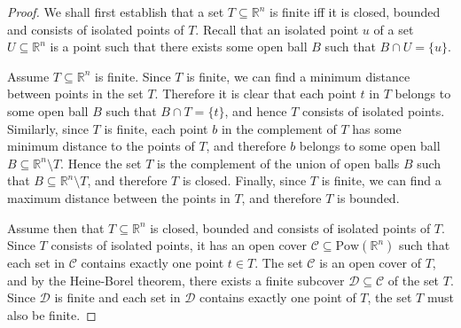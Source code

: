 \documentclass{LMCS}
\theoremstyle{plain}
\newcommand{\rsq}{\mathbb{R}^n}
\begin{document}
%
\begin{proof}
%
We shall first establish that a set $T\subseteq\rsq$ is finite
%
iff it is closed, bounded and
%
consists of isolated points of $T$. Recall that an
%
isolated point $u$ of a set $U\subseteq\rsq$ is a point
%
such that there exists some open ball $B$ such that $B\cap U =\{u\}$.
%
%
%
%

Assume $T\subseteq\rsq$ is finite. Since $T$ is finite, we can find a minimum 
%
distance between points in the set $T$.
%
Therefore it is clear that each point $t$ in $T$ belongs to some open ball $B$
%
such that $B\cap T = \{t\}$, and hence $T$
%
consists of isolated points.
%
Similarly, since $T$ is finite, each point $b$ in the complement of $T$
%
has some minimum distance to the points of $T$, and therefore $b$
%
belongs to some open ball $B\subseteq\rsq\setminus T$.
%
Hence the set $T$ is the complement of the union of
%
open balls $B$ such that $B\subseteq\rsq\setminus T$, and therefore $T$ is closed.
%
Finally, since $T$ is finite, we can find a
%
maximum distance between the points in $T$,
%
and therefore $T$ is bounded.
%



%
Assume then that $T\subseteq\rsq$ is closed, bounded and consists of isolated points of $T$.
%
Since $T$ consists of isolated points, it has an open cover $\mathcal{C}\subseteq\mathrm{Pow}(\rsq)$ such
%
that each set in $\mathcal{C}$ contains exactly one point $t\in T$. The set $\mathcal{C}$ is an open
%
cover of $T$, and by the Heine-Borel theorem, there exists a
%
finite subcover $\mathcal{D}\subseteq\mathcal{C}$ of the set $T$.
%
Since $\mathcal{D}$ is finite and each set in $\mathcal{D}$ contains exactly one point of $T$, 
%
the set $T$ must also be finite.
%




\end{proof}
\end{document}
